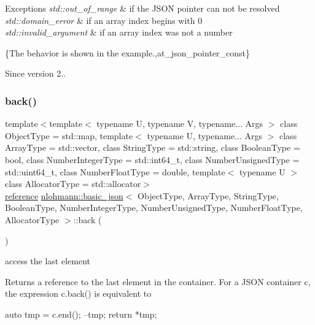 \begin{DoxyExceptions}{Exceptions}
{\em std\+::out\+\_\+of\+\_\+range} & if the J\+S\+ON pointer can not be resolved \\
\hline
{\em std\+::domain\+\_\+error} & if an array index begins with \textquotesingle{}0\textquotesingle{} \\
\hline
{\em std\+::invalid\+\_\+argument} & if an array index was not a number\\
\hline
\end{DoxyExceptions}
\{The behavior is shown in the example.,at\+\_\+json\+\_\+pointer\+\_\+const\}

\begin{DoxySince}{Since}
version 2.. 
\end{DoxySince}
\hypertarget{classnlohmann_1_1basic__json_a71b1d38ef402dfee58fba1fe01fa67f5}{}\label{classnlohmann_1_1basic__json_a71b1d38ef402dfee58fba1fe01fa67f5} 
\subsubsection{\texorpdfstring{back()}{back()}\hspace{0.1cm}{\footnotesize\ttfamily [1/2]}}
{\footnotesize\ttfamily template$<$template$<$ typename U, typename V, typename... Args $>$ class Object\+Type = std\+::map, template$<$ typename U, typename... Args $>$ class Array\+Type = std\+::vector, class String\+Type  = std\+::string, class Boolean\+Type  = bool, class Number\+Integer\+Type  = std\+::int64\+\_\+t, class Number\+Unsigned\+Type  = std\+::uint64\+\_\+t, class Number\+Float\+Type  = double, template$<$ typename U $>$ class Allocator\+Type = std\+::allocator$>$ \\
\hyperlink{classnlohmann_1_1basic__json_a3ec8e17be8732fe436e9d6733f52b7a3}{reference} \hyperlink{classnlohmann_1_1basic__json}{nlohmann\+::basic\+\_\+json}$<$ Object\+Type, Array\+Type, String\+Type, Boolean\+Type, Number\+Integer\+Type, Number\+Unsigned\+Type, Number\+Float\+Type, Allocator\+Type $>$\+::back (\begin{DoxyParamCaption}{ }\end{DoxyParamCaption})\hspace{0.3cm}{\ttfamily [inline]}}



access the last element 

Returns a reference to the last element in the container. For a J\+S\+ON container {\ttfamily c}, the expression {\ttfamily c.\+back()} is equivalent to 
\begin{DoxyCode}
\textcolor{keyword}{auto} tmp = c.end();
--tmp;
\textcolor{keywordflow}{return} *tmp;
\end{DoxyCode}


